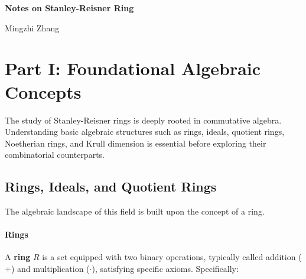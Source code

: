 \documentclass[12pt]{article}
\theoremstyle{definition}
\numberwithin{equation}{subsection}
\begin{document}
\begin{center}
    {\Large\bf Notes on Stanley-Reisner Ring}
\end{center}
\vskip 3mm
\begin{center}
    Mingzhi Zhang
\end{center}
\vskip 3mm

\section*{Part I: Foundational Algebraic Concepts}

The study of Stanley-Reisner rings is deeply rooted in commutative algebra. Understanding basic algebraic structures such as rings, ideals, quotient rings, Noetherian rings, and Krull dimension is essential before exploring their combinatorial counterparts.

\subsection{Rings, Ideals, and Quotient Rings}

The algebraic landscape of this field is built upon the concept of a ring.

\paragraph{Rings}
A \textbf{ring} $R$ is a set equipped with two binary operations, typically called addition ($+$) and multiplication ($\cdot$), satisfying specific axioms. Specifically:
\end{document}
